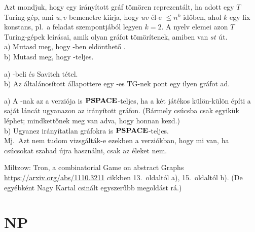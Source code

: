 \begin{Exercise}[counter={sorszam}, difficulty=0]
	Azt mondjuk, hogy egy ir\'any\'itott %
	gr\'af t\"om\"oren reprezent\'alt, ha adott egy $T$ Turing-g\'ep, ami $u,v$ bemenetre ki\'irja, hogy $uv$ \'el-e $\le n^k$ id\H oben, ahol $k$ egy fix konstans, pl.\ a feladat szempontj\'ab\'ol legyen $k=2$. A  nyelv elemei azon $T$ Turing-g\'epek le\'ir\'asai, amik olyan gr\'afot t\"om\"or\'itenek, amiben van $st$ \'ut.\\
	a) Mutasd meg, hogy \PSPACE-ben eld\"onthet\H o .\\
	b) Mutasd meg, hogy  \PSPACE-teljes.
\end{Exercise}	
\begin{Answer}
	a) -beli \'es Savitch t\'etel.\\
	b) Az \'altal\'anos\'itott \'allapottere egy \PSPACE-es TG-nek pont egy ilyen gr\'afot ad.
\end{Answer}



\begin{Exercise}[counter={sorszam}, difficulty=2]
	a) A -nak az a verzi\'oja is $\mbox{\ensuremath{\mathbf{PSPACE}}}$-teljes, ha a k\'et j\'at\'ekos k\"ul\"on-k\"ul\"on \'ep\'iti a saj\'at l\'anc\'at ugyanazon az ir\'any\'itott gr\'afon.
	(B\'armely cs\'ucsba csak egyik\"uk l\'ephet; mindkett\H onek meg van adva, hogy honnan kezd.)\\
	b) Ugyanez ir\'any\'itatlan gr\'afokra is $\mbox{\ensuremath{\mathbf{PSPACE}}}$-teljes.\\
	Mj.\ Azt nem tudom vizsg\'alt\'ak-e ezekben a verzi\'okban, hogy mi van, ha cs\'ucsokat szabad \'ujra haszn\'alni, csak az \'eleket nem.
\end{Exercise}	
\begin{Answer}
	Miltzow: Tron, a combinatorial Game on abstract Graphs \url{https://arxiv.org/abs/1110.3211} cikkben 13.~oldalt\'ol a), 15.\ oldalt\'ol b). (De egy\'ebk\'ent Nagy Kartal csin\'alt egyszer\H ubb megold\'ast r\'a.) 
\end{Answer}






\chapter{NP}



